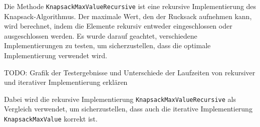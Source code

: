 Die Methode \texttt{KnapsackMaxValueRecursive} ist eine rekursive Implementierung des Knapsack-Algorithmus. Der maximale
Wert, den der Rucksack aufnehmen kann, wird berechnet, indem die Elemente rekursiv entweder eingeschlossen oder ausgeschlossen
werden. Es wurde darauf geachtet, verschiedene Implementierungen zu testen, um sicherzustellen, dass die optimale
Implementierung verwendet wird.

TODO: Grafik der Testergebnisse und Unterschiede der Laufzeiten von rekursiver und iterativer Implementierung erklären

Dabei wird die rekursive Implementierung \texttt{KnapsackMaxValueRecursive} als Vergleich verwendet, um sicherzustellen, dass
auch die iterative Implementierung \texttt{KnapsackMaxValue} korrekt ist.